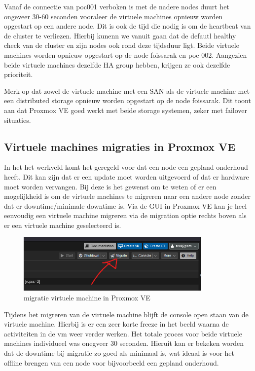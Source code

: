 Vanaf de connectie van poc001 verboken is met de nadere nodes duurt het ongeveer 30-60 seconden vooraleer de virtuele machines opnieuw worden opgestart op een andere node. Dit is ook de tijd die nodig is om de heartbeat van de cluster te verliezen.
Hierbij kunenn we vanuit gaan dat de defautl healthy check van de cluster en zijn nodes ook rond deze tijdsduur ligt. Beide virtuele machines worden opnieuw opgestart op de node foissarak en poc 002. 
Aangezien beide virtuele machines dezelfde HA group hebben, krijgen ze ook dezelfde prioriteit.

Merk op dat zowel de virtuele machine met een SAN als de virtuele machine met een distributed storage opnieuw worden opgestart op de node foissarak. Dit toont aan dat Proxmox VE goed werkt met beide storage systemen, zeker met failover situaties.


\subsection{Virtuele machines migraties in Proxmox VE}
In het het werkveld komt het geregeld voor dat een node een gepland onderhoud heeft. Dit kan zijn dat er een update moet worden uitgevoerd of dat er hardware moet worden vervangen.
Bij deze is het gewenst om te weten of er een mogelijkheid is om de virtuele machines te migreren naar een andere node zonder dat er downtime/minimale downtime is.
Via de GUI in Proxmox VE kan je heel eenvoudig een virtuele machine migreren via de migration optie rechts boven als er een virtuele machine geselecteerd is.
\begin{figure}[H]
  \centering
  \includegraphics[width=0.85\textwidth]{../poc/vm-migratie-prox.png}
  \caption{migratie virtuele machine in Proxmox VE}
  \label{fig:migratie-vm}
\end{figure}
Tijdens het migreren van de virtuele machine blijft de console open staan van de virtuele machine. Hierbij is er een zeer korte freeze in het beeld waarna de activiteiten in de vm weer verder werken. Het totale proces voor beide virtuele machines individueel was onegveer 30 seconden.
Hieruit kan er bekeken worden dat de downtime bij migratie zo goed als minimaal is, wat ideaal is voor het offline brengen van een node voor bijvoorbeeld een gepland onderhoud.


